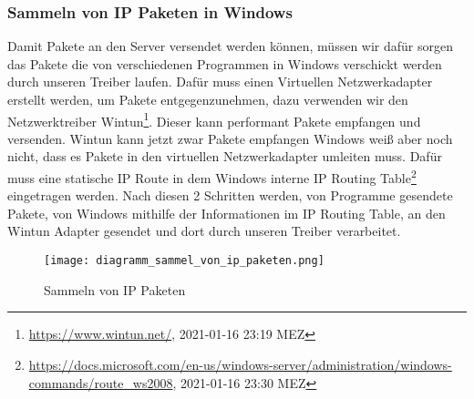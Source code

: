\subsubsection{Sammeln von IP Paketen in Windows}
Damit Pakete an den Server versendet werden können, müssen wir dafür sorgen das Pakete die von verschiedenen Programmen in Windows verschickt werden durch unseren Treiber laufen. Dafür muss einen Virtuellen Netzwerkadapter erstellt werden, um Pakete entgegenzunehmen, dazu verwenden wir den Netzwerktreiber Wintun\footnote[1]{\url{https://www.wintun.net/}, 2021-01-16 23:19 MEZ}. Dieser kann performant Pakete empfangen und versenden.
\newline
\newline
Wintun kann jetzt zwar Pakete empfangen Windows weiß aber noch nicht, dass es Pakete in den virtuellen Netzwerkadapter umleiten muss. Dafür muss eine statische IP Route in dem Windows interne IP Routing Table\footnote[2]{\url{https://docs.microsoft.com/en-us/windows-server/administration/windows-commands/route_ws2008}, 2021-01-16 23:30 MEZ} eingetragen werden.
\newline
\newline
Nach diesen 2 Schritten werden, von Programme gesendete Pakete, von Windows mithilfe  der Informationen im IP Routing Table, an den Wintun Adapter gesendet und dort durch unseren Treiber verarbeitet.
\begin{figure}[H]
    \centering
    \texttt{[image: diagramm\_sammel\_von\_ip\_paketen.png]}
    \caption[Sammeln von IP Paketen]{Sammeln von IP Paketen } 
\end{figure}